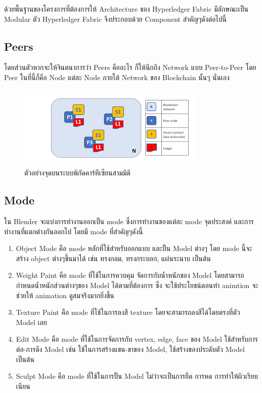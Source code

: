 ด้วยพื้นฐานของโครงการที่ต้องการให้ Architecture ของ Hyperledger Fabric มีลักษณะเป็น Modular ตัว Hyperledger Fabric จึงประกอบด้วย Component สำคัญๆดังต่อไปนี้
\subsection{Peers}
 โดยส่วนตัวหากจะให้จินตนาการว่า Peers คืออะไร ก็ให้นึกถึง Network แบบ Peer-to-Peer โดย Peer ในที่นี้ก็คือ Node แต่ละ Node ภายใต้ Network ของ Blockchain นั้นๆ นั่นเอง
 \graphicspath{ {./images/} }

 \begin{figure}[htbp]
   \centering 
   \includegraphics[scale=1]{h.png}
   \caption[Cartesian coordinate]{ตัวอย่างจุดบนระบบพิกัดคาร์ทีเซียนสามมิติ}
   \label{fig:Heart1}
 \end{figure}



\subsection{Mode}
ใน Blender จะแบ่งการทำงานออกเป็น mode ซึ่งการทำงานของแต่ละ mode จุดประสงค์ และการทำงานที่แตกต่างกันออกไป โดยมี mode ที่สำคัญๆดังนี้
\begin{enumerate}
\item Object Mode คือ mode หลักที่ใช้สำหรับออกแบบ และปั้น Model ต่างๆ โดย mode นี้จะสร้าง object ต่างๆขึ้นมาได้ เช่น 
ทรงกลม, ทรงกระบอก, แผ่นระนาบ เป็นต้น
\item Weight Paint คือ mode ที่ใช้ในการควบคุม จัดการกับน้ำหนักของ Model โดยสามารถกำหนดน้ำหนักส่วนต่างๆของ Model ได้ตามที่ต้องการ 
ซึ่ง จะใช้ประโยชน์ตอนทำ animtion จะช่วยให้ animation ดูสมจริงมากยิ่งขึ้น
\item Texture Paint คือ mode ที่ใช้ในการลงสี texture โดยจะสามารถลงสีได้โดยตรงที่ตัว Model เลย
\item Edit Mode คือ mode ที่ใช้ในการจัดการกับ vertex, edge, face ของ Model ใช้สำหรับการต่อ-การดึง Model เช่น 
ใช้ในการสร้างแขน-ขาของ Model, ใช้สร้างของประดับตัว Model เป็นต้น
\item Sculpt Mode คือ mode ที่ใช้ในการปั้น Model ไม่ว่าจะเป็นการยืด การหด การทำให้ผิวเรียบเนียน
\end{enumerate}

